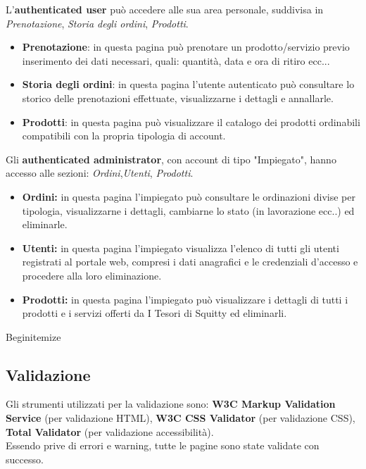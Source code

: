 L'\textbf{authenticated user} può accedere alle sua area personale, suddivisa in \textit{Prenotazione}, \textit{Storia degli ordini}, \textit{Prodotti}.

\begin{itemize}
	\item \textbf{Prenotazione}: in questa pagina può prenotare un prodotto/servizio previo inserimento dei dati necessari, quali: quantità, data e ora di ritiro ecc...

	\item \textbf{Storia degli ordini}: in questa pagina l'utente autenticato può consultare lo storico delle prenotazioni effettuate, visualizzarne i dettagli e annallarle.

	\item \textbf{Prodotti}: in questa pagina può visualizzare il catalogo dei prodotti ordinabili compatibili con la propria tipologia di account.
\end{itemize}

Gli \textbf{authenticated administrator}, con account di tipo "Impiegato", hanno accesso alle sezioni: \textit{Ordini},\textit{Utenti}, \textit{Prodotti}.

\begin{itemize}
	\item \textbf{Ordini:} in questa pagina l'impiegato può consultare le ordinazioni divise per tipologia, visualizzarne i dettagli, cambiarne lo stato (in lavorazione ecc..) ed eliminarle.

	\item \textbf{Utenti:} in questa pagina l'impiegato visualizza l'elenco di tutti gli utenti registrati al portale web, compresi i dati anagrafici e le credenziali d'accesso e procedere alla loro eliminazione.

	\item \textbf{Prodotti:} in questa pagina l'impiegato può visualizzare i dettagli di tutti i prodotti e i servizi offerti da I Tesori di Squitty ed eliminarli.
\end{itemize}


Begin{itemize}

\subsection{Validazione}

Gli strumenti utilizzati per la validazione sono: \textbf{W3C Markup Validation Service} (per validazione HTML), \textbf{W3C CSS Validator} (per validazione CSS), \textbf{Total Validator} (per validazione accessibilità).\\
Essendo prive di errori e warning, tutte le pagine sono state validate con successo.

